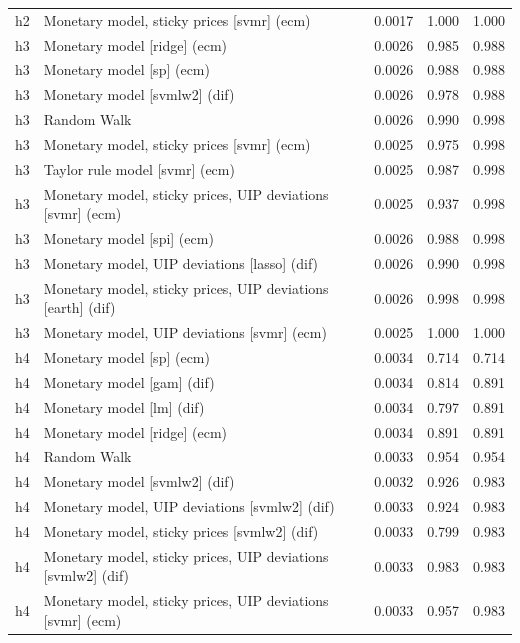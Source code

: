 \begin{ThreePartTable}
\begin{longtable}[t]{cp{5.5cm}ccc}
h2 & \raggedright Monetary model, sticky prices [svmr] (ecm) & 0.0017 & 1.000 & 1.000\\
\addlinespace
h3 & \raggedright Monetary model [ridge] (ecm) & 0.0026 & 0.985 & 0.988\\
h3 & \raggedright Monetary model [sp] (ecm) & 0.0026 & 0.988 & 0.988\\
h3 & \raggedright Monetary model [svmlw2] (dif) & 0.0026 & 0.978 & 0.988\\
h3 & \raggedright Random Walk & 0.0026 & 0.990 & 0.998\\
h3 & \raggedright Monetary model, sticky prices [svmr] (ecm) & 0.0025 & 0.975 & 0.998\\
h3 & \raggedright Taylor rule model [svmr] (ecm) & 0.0025 & 0.987 & 0.998\\
h3 & \raggedright Monetary model, sticky prices, UIP deviations [svmr] (ecm) & 0.0025 & 0.937 & 0.998\\
h3 & \raggedright Monetary model [spi] (ecm) & 0.0026 & 0.988 & 0.998\\
h3 & \raggedright Monetary model, UIP deviations [lasso] (dif) & 0.0026 & 0.990 & 0.998\\
h3 & \raggedright Monetary model, sticky prices, UIP deviations [earth] (dif) & 0.0026 & 0.998 & 0.998\\
h3 & \raggedright Monetary model, UIP deviations [svmr] (ecm) & 0.0025 & 1.000 & 1.000\\
\addlinespace
h4 & \raggedright Monetary model [sp] (ecm) & 0.0034 & 0.714 & 0.714\\
h4 & \raggedright Monetary model [gam] (dif) & 0.0034 & 0.814 & 0.891\\
h4 & \raggedright Monetary model [lm] (dif) & 0.0034 & 0.797 & 0.891\\
h4 & \raggedright Monetary model [ridge] (ecm) & 0.0034 & 0.891 & 0.891\\
h4 & \raggedright Random Walk & 0.0033 & 0.954 & 0.954\\
h4 & \raggedright Monetary model [svmlw2] (dif) & 0.0032 & 0.926 & 0.983\\
h4 & \raggedright Monetary model, UIP deviations [svmlw2] (dif) & 0.0033 & 0.924 & 0.983\\
h4 & \raggedright Monetary model, sticky prices [svmlw2] (dif) & 0.0033 & 0.799 & 0.983\\
h4 & \raggedright Monetary model, sticky prices, UIP deviations [svmlw2] (dif) & 0.0033 & 0.983 & 0.983\\
h4 & \raggedright Monetary model, sticky prices, UIP deviations [svmr] (ecm) & 0.0033 & 0.957 & 0.983\\

\end{longtable}
\end{ThreePartTable}
